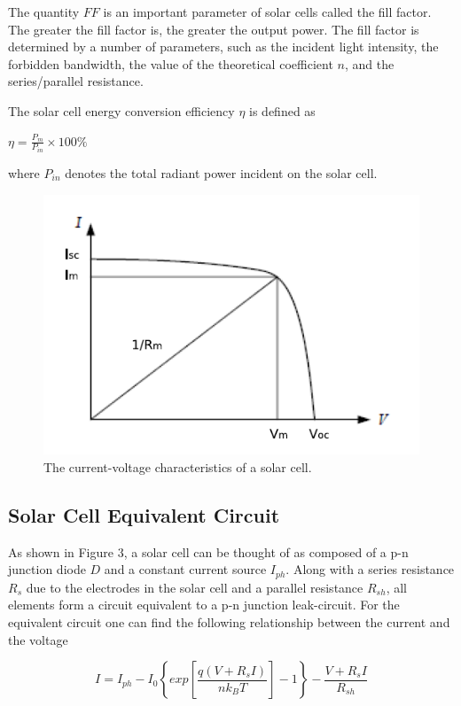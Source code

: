 \documentclass{article}
\begin{document}
{The quantity $FF$ is an important parameter of solar cells called the fill factor. The greater
the fill factor is, the greater the output power. The fill factor is determined by a number
of parameters, such as the incident light intensity, the forbidden bandwidth, the value of
the theoretical coefficient $n$, and the series/parallel resistance.

The solar cell energy conversion efficiency $\eta$ is defined as

$\eta=\frac{P_m}{P_{in}}\times 100\%$

where $P_{in}$ denotes the total radiant power incident on the solar cell.

\begin{figure}[H]
	\centering
	\includegraphics[scale=0.4]{fig2.png}
	\caption{The current-voltage characteristics of a solar cell.}
\end{figure}

\subsection{Solar Cell Equivalent Circuit}

As shown in Figure 3, a solar cell can be thought of as composed of a p-n junction
diode $D$ and a constant current source $I_{ph}$. Along with a series resistance $R_s$ due to
the electrodes in the solar cell and a parallel resistance $R_{sh}$, all elements form a circuit
equivalent to a p-n junction leak-circuit. For the equivalent circuit one can find the
following relationship between the current and the voltage

$$I=I_{ph}-I_0\left\lbrace exp\left[\frac{q(V+R_sI)}{nk_BT}\right]-1\right\rbrace-\frac{V+R_sI}{R_{sh}}$$

}
\end{document}
